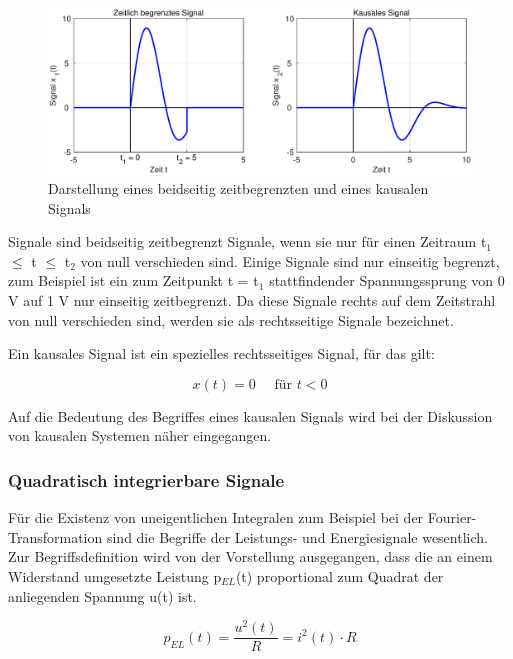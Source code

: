 \begin{figure}[H]
  \centerline{\includegraphics[width=1\textwidth]{Kapitel1/Bilder/image3.eps}}
  \caption{Darstellung eines beidseitig zeitbegrenzten und eines kausalen Signals}
  \label{fig:BegrenztKausal}
\end{figure}


\noindent Signale sind beidseitig zeitbegrenzt Signale, wenn sie nur f\"{u}r einen Zeitraum t${}_{1}$ $\leq$ t $\leq$ t${}_{2}$ von null verschieden sind. Einige Signale sind nur einseitig begrenzt, zum Beispiel ist ein zum Zeitpunkt t = t${}_{1}$ stattfindender Spannungssprung von 0 V auf 1 V nur einseitig zeitbegrenzt. Da diese Signale rechts auf dem Zeitstrahl von null verschieden sind, werden sie als rechtsseitige Signale bezeichnet. 

\noindent Ein kausales Signal ist ein spezielles rechtsseitiges Signal, für das gilt:

\begin{equation}\label{eq:onethree}
x\left(t\right)=0\quad \text{ für } t< 0 
\end{equation}

\noindent Auf die Bedeutung des Begriffes eines kausalen Signals wird bei der Diskussion von kausalen Systemen n\"{a}her eingegangen. 

\subsubsection{ Quadratisch integrierbare Signale}
F\"{u}r die Existenz von uneigentlichen Integralen zum Beispiel bei der Fourier-Transformation sind die Begriffe der Leistungs- und Energiesignale wesentlich. Zur Begriffsdefinition wird von der Vorstellung ausgegangen, dass die an einem Widerstand umgesetzte Leistung p${}_{EL}$(t) proportional zum Quadrat der anliegenden Spannung u(t) ist.


\begin{equation}\label{eq:onefour}
p_{EL} \left(t\right)=\dfrac{u^{2} \left(t\right)}{R} =i^{2} \left(t\right)\cdot R
\end{equation}

